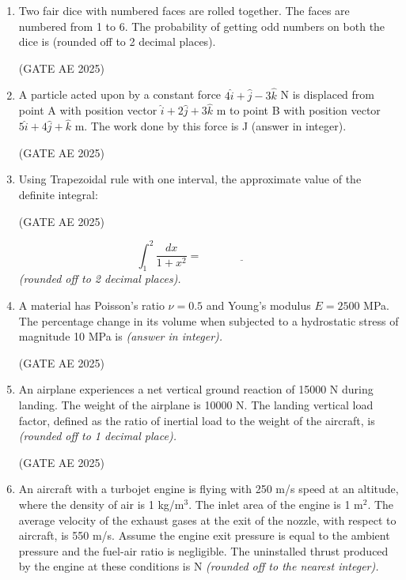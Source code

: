 \documentclass[journal,12pt,onecolumn]{IEEEtran}
\theoremstyle{remark}
\begin{document}
\begin{flushleft}
\begin{enumerate}
\item Two fair dice with numbered faces are rolled together. The faces are numbered from 1 to 6. The probability of getting odd numbers on both the dice is \underline{\hspace{3cm}} (rounded off to 2 decimal places).

\hfill (GATE AE 2025)

\item A particle acted upon by a constant force $4\hat{i} + \hat{j} - 3\hat{k}$ N is displaced from point A with position vector $\hat{i} + 2\hat{j} + 3\hat{k}$ m to point B with position vector $5\hat{i} + 4\hat{j} + \hat{k}$ m. The work done by this force is \underline{\hspace{3cm}} J (answer in integer).

\hfill (GATE AE 2025)

\item Using Trapezoidal rule with one interval, the approximate value of the definite integral:

\hfill (GATE AE 2025)

\[
\int_{1}^{2} \frac{dx}{1 + x^2}= \underline{\hspace{3cm}}\] 
\textit{(rounded off to 2 decimal places).}


\item A material has Poisson's ratio $\nu = 0.5$ and Young's modulus $E = 2500$ MPa. The percentage change in its volume when subjected to a hydrostatic stress of magnitude 10 MPa is \underline{\hspace{3cm}} \textit{(answer in integer).}

\hfill (GATE AE 2025)

\item An airplane experiences a net vertical ground reaction of 15000 N during landing. The weight of the airplane is 10000 N. The landing vertical load factor, defined as the ratio of inertial load to the weight of the aircraft, is \underline{\hspace{3cm}} \textit{(rounded off to 1 decimal place).}

\hfill (GATE AE 2025)

\item An aircraft with a turbojet engine is flying with 250 m/s speed at an altitude, where the density of air is 1 kg/m$^3$. The inlet area of the engine is 1 m$^2$. The average velocity of the exhaust gases at the exit of the nozzle, with respect to aircraft, is 550 m/s. Assume the engine exit pressure is equal to the ambient pressure and the fuel-air ratio is negligible. The uninstalled thrust produced by the engine at these conditions is \underline{\hspace{3cm}} N \textit{(rounded off to the nearest integer).}


\end{enumerate}
\end{flushleft}
\end{document}
